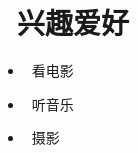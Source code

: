 \documentclass{resume}
\begin{document}
\section{\faSunO\ 兴趣爱好} \vspace{1mm}

\begin{itemize}[parsep=1ex]
	\item \faFilm\ {看电影}
	\item \faHeadphones\ {听音乐}
	\item \faCamera\ {摄影}
\end{itemize}

\end{document}
